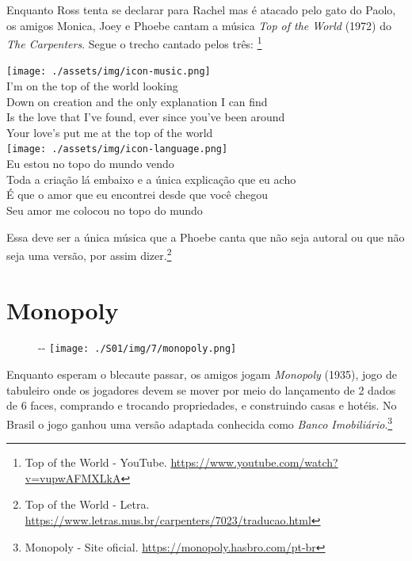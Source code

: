 Enquanto Ross tenta se declarar para Rachel mas é atacado pelo gato do
Paolo, os amigos Monica, Joey e Phoebe cantam a música \emph{Top of the
World} (1972) do \emph{The Carpenters}. Segue o trecho cantado pelos
três: \footnote{\sloppy Top of the World - YouTube. \url{https://www.youtube.com/watch?v=vupwAFMXLkA}}

\bigskip
\begin{tcolorbox}[enhanced,
    drop fuzzy shadow southeast, boxrule=0.3pt,
    lower separated=false, sidebyside, sidebyside align=top,
    halign=flush right, halign lower=left, breakable,
    colframe=black!30!dialogoBorder,colback=musicaBg]
\texttt{[image: ./assets/img/icon-music.png]}\\
I’m on the top of the world looking\\Down on creation and the only explanation I can find\\Is the love that I’ve found, ever since you’ve been around\\Your love’s put me at the top of the world\\
\tcblower
\texttt{[image: ./assets/img/icon-language.png]}\\
Eu estou no topo do mundo vendo\\Toda a criação lá embaixo e a única explicação que eu acho\\É que o amor que eu encontrei desde que você chegou\\Seu amor me colocou no topo do mundo\\
\end{tcolorbox}

Essa deve ser a única música que a Phoebe canta que não seja autoral ou
que não seja uma versão, por assim dizer.\footnote{\sloppy Top of the World - Letra. \url{https://www.letras.mus.br/carpenters/7023/traducao.html}}

\hypertarget{monopoly}{%
\section{Monopoly}\label{monopoly}}

\begin{figure}[!ht]
  \begin{adjustwidth}{-\oddsidemargin-1in}{-\rightmargin}
    \centering
    \texttt{[image: ./S01/img/7/monopoly.png]}
  \end{adjustwidth}
\end{figure}

Enquanto esperam o blecaute passar, os amigos jogam \emph{Monopoly}
(1935), jogo de tabuleiro onde os jogadores devem se mover por meio do
lançamento de 2 dados de 6 faces, comprando e trocando propriedades, e
construindo casas e hotéis. No Brasil o jogo ganhou uma versão adaptada
conhecida como \emph{Banco Imobiliário}.\footnote{\sloppy Monopoly - Site oficial. \url{https://monopoly.hasbro.com/pt-br}}
